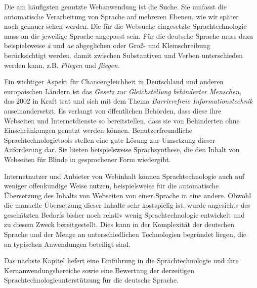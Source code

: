 \documentclass[]{../../metanetpaper}
\begin{document}
\begin{Parallel}[c]{80mm}{80mm}
{Die am häufigsten genutzte Webanwendung ist die Suche. Sie umfasst die automatische Verarbeitung von Sprache auf mehreren Ebenen, wie wir später noch genauer sehen werden. Die für die Websuche eingesetzte Sprachtechnologie muss an die jeweilige Sprache angepasst sein. Für die deutsche Sprache muss dazu beispielsweise \textit{ä} und \textit{ae} abgeglichen oder Groß- und Kleinschreibung berücksichtigt werden, damit zwischen Substantiven und Verben unterschieden werden kann, z.B. \textit{Fliegen} und \textit{fliegen}. 

Ein wichtiger Aspekt für Chancengleichheit in Deutschland und anderen europäischen Ländern ist das \textit{Gesetz zur Gleichstellung behinderter Menschen}, das 2002 in Kraft trat und sich mit dem Thema \textit{Barrierefreie Informationstechnik} auseinandersetzt. Es verlangt von öffentlichen Behörden, dass diese ihre Webseiten und Internetdienste so bereitstellen, dass sie von Behinderten ohne Einschränkungen genutzt werden können. Benutzerfreundliche Sprachtechnologietools stellen eine gute Lösung zur Umsetzung dieser Anforderung dar. Sie bieten beispielsweise Sprachsynthese, die den Inhalt von Webseiten für Blinde in gesprochener Form wiedergibt.

Internetnutzer und Anbieter von Webinhalt können Sprachtechnologie auch auf weniger offenkundige Weise nutzen, beispielsweise für die automatische Übersetzung des Inhalts von Webseiten von einer Sprache in eine andere. Obwohl die manuelle Übersetzung dieser Inhalte sehr kostspielig ist, wurde angesichts des geschätzten Bedarfs bisher noch relativ wenig Sprachtechnologie entwickelt und zu diesem Zweck bereitgestellt. Dies kann in der Komplexität der deutschen Sprache und der Menge an unterschiedlichen Technologien begründet liegen, die an typischen Anwendungen beteiligt sind. 

Das nächste Kapitel liefert eine Einführung in die Sprachtechnologie und ihre Kernanwendungsbereiche sowie eine Bewertung der derzeitigen Sprachtechnologieunterstützung für die deutsche Sprache.
  }

\end{Parallel}
\end{document}
